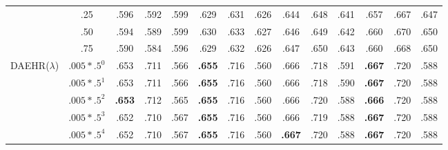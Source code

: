 \documentclass{article}
\begin{document}
\begin{table*}
{\begin{center}
\begin{tabular}{*{14}{c}}
& .25 &   .596 & .592 & .599 &     .629 & .631 & .626     & .644 & .648 & .641     & .657 & .667 & .647    \\   			& .50 &   .594 & .589 & .599 &     .630 & .633 & .627     & .646 & .649 & .642    & .660 & .670 & .650    \\
& .75 &   .590 & .584 & .596 &     .629 & .632 & .626     & .647 & .650 & .643    & .660 & .668 & .650    \\
     \cmidrule(lr){1-2}                        
 \cmidrule(lr){3-5}
\cmidrule(lr){6-8}
\cmidrule(lr){9-11}
\cmidrule(lr){12-14}
     \multirow{5}{*}{DAEHR($\lambda$)} 
     & $.005*.5^{0}$ &   .653 & .711 & .566 &     \textbf{.655} & .716 & .560     & .666 & .718 & .591    & \textbf{.667} & .720 & .588   \\
     & $.005*.5^{1}$ &   .653 & .711 & .566 &     \textbf{.655} & .716 & .560     & .666 & .718 & .590     & \textbf{.667} & .720 & .588   \\     
     & $.005*.5^{2}$ &   \textbf{.653} & .712  & .565 &     \textbf{.655} & .716 & .560      & .666 & .720 & .588    & \textbf{.666} & .720 & .588   \\
     & $.005*.5^{3}$ &   .652 & .710 & .567 &     \textbf{.655} & .716 & .560     & .666 & .719 & .588     &\textbf{.667} & .720 & .588    \\
     & $.005*.5^{4}$ &   .652 & .710 & .567 &     \textbf{.655} & .716 & .560      & \textbf{.667} & .720 & .588    & \textbf{.667} & .720 & .588   \\     
     \bottomrule
 
\end{tabular}

\end{center}
}
\end{table*}
\end{document}
